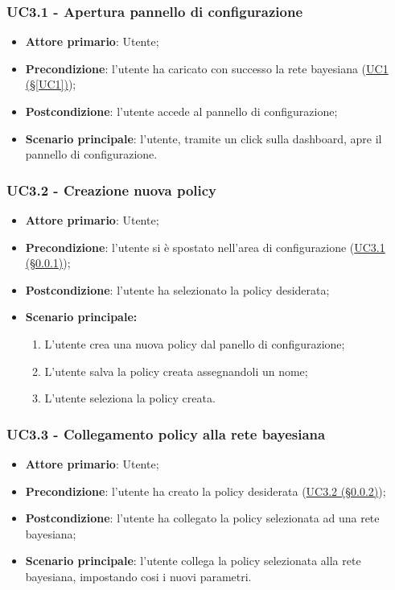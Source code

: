 \subsubsection{UC3.1 - Apertura pannello di configurazione}\label{UC3.1}
\begin{itemize}
	\item \textbf{Attore primario}: Utente; 
	\item \textbf{Precondizione}: l'utente ha caricato con successo la rete bayesiana (\hyperref[UC1]{UC1 (§\ref*{UC1})});
	\item \textbf{Postcondizione}: l'utente accede al pannello di configurazione;
	\item \textbf{Scenario principale}: l'utente, tramite un click sulla dashboard, apre il pannello di configurazione. 
\end{itemize}

\subsubsection{UC3.2 - Creazione nuova policy}\label{UC3.2}

\begin{itemize}
	\item \textbf{Attore primario}: Utente; 
	\item \textbf{Precondizione}: l'utente si è spostato nell'area di configurazione (\hyperref[UC3.1]{UC3.1 (§\ref*{UC3.1})});
	\item \textbf{Postcondizione}: l'utente ha selezionato la policy desiderata;
	\item \textbf{Scenario principale:}

	\begin{enumerate}
		\item L'utente crea una nuova policy dal panello di configurazione;
		\item L'utente salva la policy creata assegnandoli un nome; 
		\item L'utente seleziona la policy creata.
	\end{enumerate}
	
\end{itemize}

\subsubsection{UC3.3 - Collegamento policy alla rete bayesiana}\label{UC3.3}
\begin{itemize}
	\item \textbf{Attore primario}: Utente; 
	\item \textbf{Precondizione}: l'utente ha creato la policy desiderata (\hyperref[UC3.2]{UC3.2 (§\ref*{UC3.2})});
	\item \textbf{Postcondizione}: l'utente ha collegato la policy selezionata ad una rete bayesiana; 
	\item \textbf{Scenario principale}: l'utente collega la policy selezionata alla rete bayesiana, impostando cosi i nuovi parametri. 
\end{itemize}

